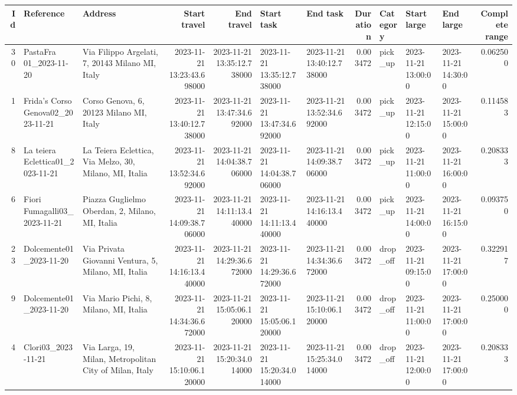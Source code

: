 \documentclass[titlepage]{article}
\begin{document}
\begin{table}[H]
\centering
\begin{adjustbox}{max width=\textwidth}
\begin{tabular}{rllrrllrlllr}
\toprule
Id & Reference & Address & Start travel & End travel & Start task & End task & Duration & Category & Start large & End large & Complete range \\
\midrule
30 & PastaFra 01\_2023-11-20 & Via Filippo Argelati, 7, 20143 Milano MI, Italy & 2023-11-21 13:23:43.698000 & 2023-11-21 13:35:12.738000 & 2023-11-21 13:35:12.738000 & 2023-11-21 13:40:12.738000 & 0.003472 & pick\_up & 2023-11-21 13:00:00 & 2023-11-21 14:30:00 & 0.062500 \\
1 & Frida's Corso Genova02\_2023-11-21 & Corso Genova, 6, 20123 Milano MI, Italy & 2023-11-21 13:40:12.738000 & 2023-11-21 13:47:34.692000 & 2023-11-21 13:47:34.692000 & 2023-11-21 13:52:34.692000 & 0.003472 & pick\_up & 2023-11-21 12:15:00 & 2023-11-21 15:00:00 & 0.114583 \\
8 & La teiera Eclettica01\_2023-11-21 & La Teiera Eclettica, Via Melzo, 30, Milano, MI, Italia & 2023-11-21 13:52:34.692000 & 2023-11-21 14:04:38.706000 & 2023-11-21 14:04:38.706000 & 2023-11-21 14:09:38.706000 & 0.003472 & pick\_up & 2023-11-21 11:00:00 & 2023-11-21 16:00:00 & 0.208333 \\
6 & Fiori Fumagalli03\_2023-11-21 & Piazza Guglielmo Oberdan, 2, Milano, MI, Italia & 2023-11-21 14:09:38.706000 & 2023-11-21 14:11:13.440000 & 2023-11-21 14:11:13.440000 & 2023-11-21 14:16:13.440000 & 0.003472 & pick\_up & 2023-11-21 14:00:00 & 2023-11-21 16:15:00 & 0.093750 \\
23 & Dolcemente01\_2023-11-20 & Via Privata Giovanni Ventura, 5, Milano, MI, Italia & 2023-11-21 14:16:13.440000 & 2023-11-21 14:29:36.672000 & 2023-11-21 14:29:36.672000 & 2023-11-21 14:34:36.672000 & 0.003472 & drop\_off & 2023-11-21 09:15:00 & 2023-11-21 17:00:00 & 0.322917 \\
9 & Dolcemente01\_2023-11-20 & Via Mario Pichi, 8, Milano, MI, Italia & 2023-11-21 14:34:36.672000 & 2023-11-21 15:05:06.120000 & 2023-11-21 15:05:06.120000 & 2023-11-21 15:10:06.120000 & 0.003472 & drop\_off & 2023-11-21 11:00:00 & 2023-11-21 17:00:00 & 0.250000 \\
4 & Clori03\_2023-11-21 & Via Larga, 19, Milan, Metropolitan City of Milan, Italy & 2023-11-21 15:10:06.120000 & 2023-11-21 15:20:34.014000 & 2023-11-21 15:20:34.014000 & 2023-11-21 15:25:34.014000 & 0.003472 & drop\_off & 2023-11-21 12:00:00 & 2023-11-21 17:00:00 & 0.208333 \\

\end{tabular}
\end{adjustbox}
\end{table}
\end{document}
